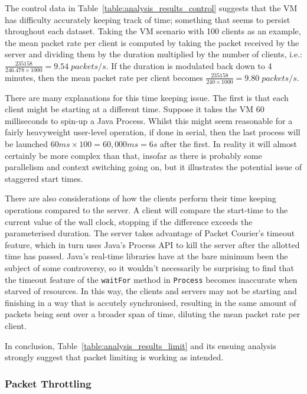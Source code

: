 The control data in Table~\ref{table:analysis_results_control} suggests that the VM has difficulty accurately keeping
track of time; something that seems to persist throughout each dataset. Taking the VM scenario with 100 clients as an
example, the mean packet rate per client is computed by taking the packet received by the server and dividing them by
the duration multiplied by the number of clients, i.e.: $\frac{235158}{246.478 \times 1000} = 9.54 \; packets/s$. If
the duration is modulated back down to 4 minutes, then the mean packet rate per client becomes
$\frac{235158}{240 \times 1000} = 9.80 \; packets/s$.

There are many explanations for this time keeping issue. The first is that each client might be starting at a
different time. Suppose it takes the VM 60 milliseconds to spin-up a Java Process\cite{java_Process}. Whilst this
might seem reasonable for a fairly heavyweight user-level operation, if done in serial, then the last process will be
launched $60ms \times 100 = 60,000ms = 6s$ after the first. In reality it will almost certainly be more complex than
that, insofar as there is probably some parallelism and context switching going on, but it illustrates the potential
issue of staggered start times.

There are also considerations of how the clients perform their time keeping operations compared to the server. A
client will compare the start-time to the current value of the wall clock, stopping if the difference exceeds the
parameterised duration. The server takes advantage of Packet Courier's timeout feature, which in turn uses Java's
Process\cite{java_Process} API to kill the server after the allotted time has passed. Java's real-time libraries have
at the bare minimum been the subject of some controversy\cite{java_timeout_reliability}, so it wouldn't necessarily
be surprising to find that the timeout feature of the \texttt{waitFor} method in \texttt{Process} becomes inaccurate
when starved of resources. In this way, the clients and servers may not be starting and finishing in a way that is
accutely synchronised, resulting in the same amount of packets being sent over a broader span of time, diluting the
mean packet rate per client.

In conclusion, Table~\ref{table:analysis_results_limit} and its ensuing analysis strongly suggest that packet
limiting is working as intended.

\subsubsection{Packet Throttling}\label{subsubsection:throttle_analysis}

